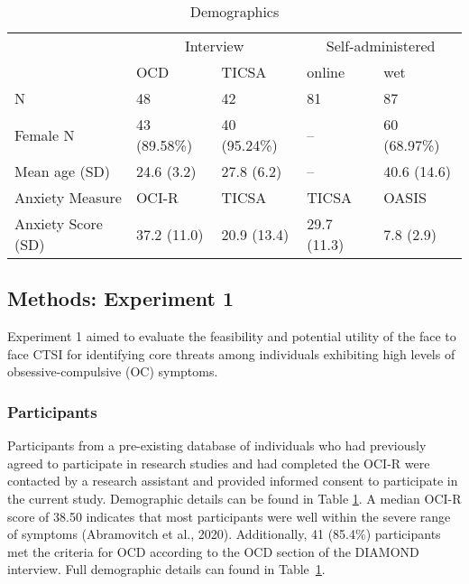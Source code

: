 \documentclass[
  man,floatsintext]{apa7}
\begin{document}
\begin{table}[tbp]

\begin{center}
\begin{threeparttable}

\caption{\label{tab:demographics}Demographics}

\begin{tabular}{lllll}
\toprule
 & \multicolumn{2}{c}{Interview} & \multicolumn{2}{c}{Self-administered} \\
\cmidrule(r){2-3} \cmidrule(r){4-5}
 & OCD & TICSA & online & wet\\
\midrule
N & 48 & 42 & 81 & 87\\
Female N & 43 (89.58\%) & 40 (95.24\%) & -- & 60 (68.97\%)\\
Mean age (SD) & 24.6 (3.2) & 27.8 (6.2) & -- & 40.6 (14.6)\\
Anxiety Measure & OCI-R & TICSA & TICSA & OASIS\\
Anxiety Score (SD) & 37.2 (11.0) & 20.9 (13.4) & 29.7 (11.3) & 7.8 (2.9)\\
\bottomrule
\end{tabular}

\end{threeparttable}
\end{center}

\end{table}

\subsection{Methods: Experiment 1}\label{methods-experiment-1}

Experiment 1 aimed to evaluate the feasibility and potential utility of the face to face CTSI for identifying core threats among individuals exhibiting high levels of obsessive-compulsive (OC) symptoms.

\subsubsection{Participants}\label{participants}

Participants from a pre-existing database of individuals who had previously agreed to participate in research studies and had completed the OCI-R were contacted
by a research assistant and provided informed consent to participate in the current study.
Demographic details can be found in Table \ref{tab:demographics}.
A median OCI-R score of 38.50 indicates that most participants were well within the severe range of symptoms (Abramovitch et al., 2020).
Additionally, 41 (85.4\%) participants met the criteria for OCD according to the OCD section of the DIAMOND interview.
Full demographic details can found in Table~\ref{tab:demographics}.
\end{document}
